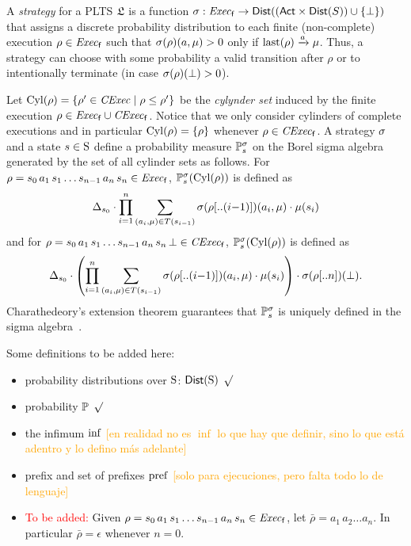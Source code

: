 A \emph{strategy} for a PLTS $\model$ is a function $\strat:
\execf \to \Dist((\Act\times\Dist(S))\cup\{\complete\})$ that assigns
a discrete probability distribution to each finite (non-complete)
execution $\rho\in\execf$ such that $\strat(\rho)(a,\mu) > 0$ only
if $\last(\rho)\reach{a}\mu$.  Thus, a strategy can choose with some
probability a valid transition after $\rho$ or to intentionally
terminate (in case $\strat(\rho)(\complete)>0$).

Let $\Cyl(\rho)=\{\rho'\in\cexec\mid{\rho\leq\rho'}\}$ be the
\emph{cylynder set} induced by the finite execution
$\rho\in\execf\cup\cexecf$.  Notice that we only consider cylinders of
complete executions and in particular $\Cyl(\rho)=\{\rho\}$ whenever
$\rho\in\cexecf$.
%
A strategy $\strat$ and a state $s\in\S$ define a probability
measure $\Prob^\strat_s$ on the Borel sigma algebra generated by the
set of all cylinder sets as follows.
%
For $\rho = s_0\, a_1\, s_1\ldots s_{n-1}\, a_n\, s_n \in \execf$, $ \textstyle\Prob^\strat_s(\Cyl(\rho))$ is defined as
%
\[
 \Dirac_{s_0}\cdot\prod\limits_{i=1}^n\sum\limits_{(a_i,\mu)\in T(s_{i-1})}\strat(\rho[..(i{-}1)])(a_i,\mu)\cdot\mu(s_i)
\]
%
and for
$\rho = s_0\, a_1\, s_1\ldots s_{n-1}\, a_n\, s_n\, \complete \in \cexecf$, $ \textstyle\Prob^\strat_s(\Cyl(\rho))$ is defined as
%
\[
   \Dirac_{s_0}\cdot\left(\prod\limits_{i=1}^n\sum\limits_{(a_i,\mu)\in T(s_{i-1})}\strat(\rho[..(i{-}1)])(a_i,\mu)\cdot\mu(s_i)\right)\cdot\strat(\rho[..n])(\complete).
\]
%
Charathedeory's extension theorem guarantees that $\Prob^\strat_s$ is
uniquely defined in the sigma algebra~\cite{Segala95}.











\bigskip

Some definitions to be added here:

\begin{itemize}
    \item probability distributions over $\S$: $\Dist(\S)$ \textcolor{green}{$\surd$}
    \item probability $\Prob$  \textcolor{green}{$\surd$}
    \item the infimum $\infim$  \textcolor{orange}{[en realidad no es $\inf$ lo que hay que definir, sino lo que est\'a adentro y lo defino m\'as adelante]}
    \item prefix and set of prefixes $\pref$ \textcolor{orange}{[solo para ejecuciones, pero falta todo lo de lenguaje]}
    \item \textcolor{red}{To be added:}
      Given $\rho = s_0\, a_1\, s_1\ldots s_{n-1}\, a_n\, s_n \in \execf$,
      let $\bar{\rho} = a_1\, a_2\ldots a_n$.
      In particular $\bar{\rho} = \epsilon$ whenever $n=0$.

\end{itemize}

